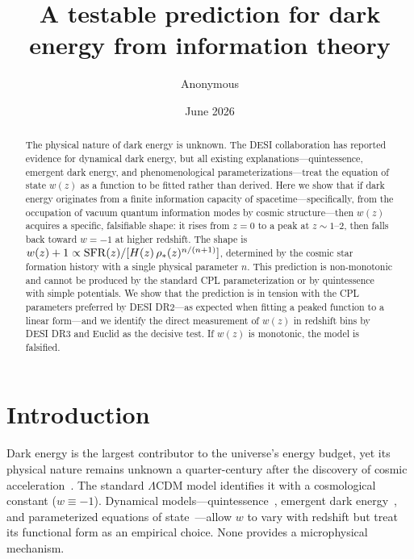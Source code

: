 \documentclass[12pt,a4paper]{article}
\begin{document}
\title{\bf A testable prediction for dark energy from information theory}

\author{Anonymous}
\date{June 2026}

\maketitle

\begin{abstract}
The physical nature of dark energy is unknown. The DESI collaboration has reported evidence for dynamical dark energy, but all existing explanations---quintessence, emergent dark energy, and phenomenological parameterizations---treat the equation of state $w(z)$ as a function to be fitted rather than derived. Here we show that if dark energy originates from a finite information capacity of spacetime---specifically, from the occupation of vacuum quantum information modes by cosmic structure---then $w(z)$ acquires a specific, falsifiable shape: it rises from $z=0$ to a peak at $z\sim1$--$2$, then falls back toward $w=-1$ at higher redshift. The shape is $w(z)+1\propto{\rm SFR}(z)/[H(z)\,\rho_*(z)^{n/(n+1)}]$, determined by the cosmic star formation history with a single physical parameter $n$. This prediction is non-monotonic and cannot be produced by the standard CPL parameterization or by quintessence with simple potentials. We show that the prediction is in tension with the CPL parameters preferred by DESI DR2---as expected when fitting a peaked function to a linear form---and we identify the direct measurement of $w(z)$ in redshift bins by DESI DR3 and Euclid as the decisive test. If $w(z)$ is monotonic, the model is falsified.
\end{abstract}

\section*{Introduction}

Dark energy is the largest contributor to the universe's energy budget, yet its physical nature remains unknown a quarter-century after the discovery of cosmic acceleration~\cite{riess1998,spergel2003}. The standard $\Lambda$CDM model identifies it with a cosmological constant ($w\equiv-1$). Dynamical models---quintessence~\cite{tsujikawa2013}, emergent dark energy~\cite{li2024}, and parameterized equations of state~\cite{chevallier2001,linder2003}---allow $w$ to vary with redshift but treat its functional form as an empirical choice. None provides a microphysical mechanism.
\end{document}
